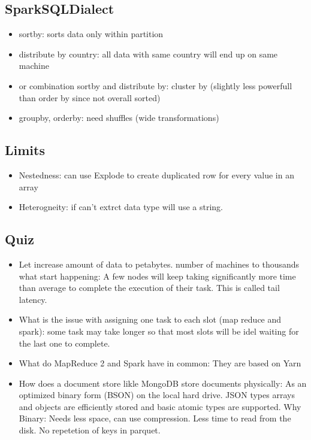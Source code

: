 \subsection{SparkSQLDialect}
\begin{itemize}
    \item sortby: sorts data only within partition
    \item distribute by country: all data with same country will end up on same machine
    \item or combination sortby and distribute by: cluster by (slightly less powerfull than order by since not overall sorted)
    \item groupby, orderby: need shuffles (wide transformations)
\end{itemize}


\subsection{Limits}
\begin{itemize}
    \item Nestedness: can use Explode to create duplicated row for every value in an array
    \item Heterogneity: if can't extrct data type will use a string.
\end{itemize}

\subsection{Quiz}
\begin{itemize}
    \item Let increase amount of data to petabytes. number of machines to thousands what start happening:
    A few nodes will keep taking significantly more time than average to complete the execution of their task.
    This is called tail latency.
    \item What is the issue with assigning one task to each slot (map reduce and spark): some task may take longer so that
    most slots will be idel waiting for the last one to complete.
    \item What do MapReduce 2 and Spark have in common: They are based on Yarn
    \item How does a document store likle MongoDB store documents physically: As an optimized binary form (BSON) on the
    local hard drive. JSON types arrays and objects are efficiently stored and basic atomic types are supported.
    Why Binary: Needs less space, can use compression. Less time to read from the disk.
    No repetetion of keys in parquet.
\end{itemize}


